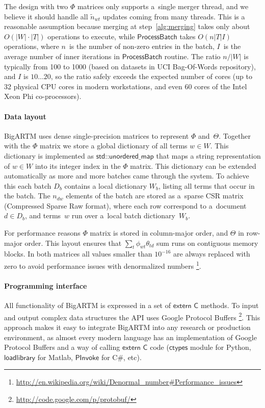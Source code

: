 \documentclass{sig-alternate}
\newcommand{\kw}[1]{\textsf{#1}}
\begin{document}
The design with two $\Phi$ matrices only supports a~single merger thread,
and we believe it should handle all $\tilde n_{wt}$ updates coming from many threads.
This is a reasonable assumption because
merging at step~\ref{alg:merging} takes only about $O(|W|\cdot|T|)$ operations to execute, while
$\kw{ProcessBatch}$ takes $O(n |T| I)$ operations,
where
$n$~is the number of non-zero entries in the batch,
$I$~is the average number of inner iterations in $\kw{ProcessBatch}$ routine.
The ratio $n / |W|$ is typically from 100 to 1000 (based on datasets in UCI Bag-Of-Words repository),
and $I$ is $10 \dots 20$, so the ratio safely exceeds the expected number of cores
(up to 32 physical CPU cores in modern workstations, and even 60 cores of the Intel Xeon Phi co-processors).

\paragraph{Data layout}
BigARTM uses dense single-precision matrices to represent $\Phi$ and~$\Theta$.
Together with the $\Phi$ matrix we store a global dictionary of all terms ${w \in W}$.
This dictionary is implemented as $\kw{std::unordered\_map}$ that maps a string representation of ${w \in W}$
into its integer index in the $\Phi$ matrix.
This dictionary can be extended automatically as more and more batches came through the system.
To achieve this each batch $D_b$ contains a local dictionary $W_b$, listing all terms that occur in the batch.
The $n_{dw}$ elements of the batch are stored as a~sparse CSR matrix (Compressed Sparse Raw format),
where each row correspond to a~document ${d \in D_b}$,
and terms~$w$ run over a~local batch dictionary~$W_b$.

For performance reasons $\Phi$ matrix is stored in column-major order, and $\Theta$ in row-major order.
This layout ensures that $\sum_t \phi_{wt} \theta_{td}$ sum runs on contiguous memory blocks.
In both matrices all values smaller than $10^{-16}$ are always replaced with zero to avoid performance issues with denormalized numbers%
\footnote{\url{http://en.wikipedia.org/wiki/Denormal_number#Performance_issues}}.

\paragraph{Programming interface}
All functionality of BigARTM is expressed in a set of $\kw{extern C}$ methods.
To input and output complex data structures the API uses Google Protocol Buffers%
\footnote{\url{http://code.google.com/p/protobuf/}}.
This approach makes it easy to integrate BigARTM into any research or production environment,
as almost every modern language has an implementation of Google Protocol Buffers
and a way of calling $\kw{extern C}$ code
($\kw{ctypes}$ module for Python, $\kw{loadlibrary}$ for Matlab, $\kw{PInvoke}$ for C\#, etc).
\end{document}
